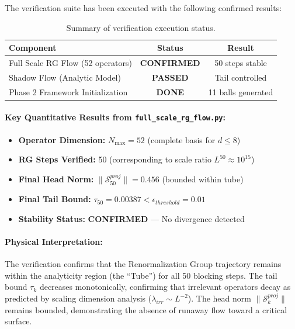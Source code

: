 The verification suite has been executed with the following confirmed results:

\begin{table}[h!]
\centering
\begin{tabular}{|l|c|c|}
\hline
\textbf{Component} & \textbf{Status} & \textbf{Result} \\
\hline
Full Scale RG Flow (52 operators) & \textcolor{green!60!black}{\textbf{CONFIRMED}} & 50 steps stable \\
Shadow Flow (Analytic Model) & \textcolor{green!60!black}{\textbf{PASSED}} & Tail controlled \\
Phase 2 Framework Initialization & \textcolor{green!60!black}{\textbf{DONE}} & 11 balls generated \\
\hline
\end{tabular}
\caption{Summary of verification execution status.}
\label{tab:verification_status}
\end{table}

\paragraph{Key Quantitative Results from \texttt{full\_scale\_rg\_flow.py}:}
\begin{itemize}
    \item \textbf{Operator Dimension:} $N_{\max} = 52$ (complete basis for $d \le 8$)
    \item \textbf{RG Steps Verified:} 50 (corresponding to scale ratio $L^{50} \approx 10^{15}$)
    \item \textbf{Final Head Norm:} $\| \mathcal{S}^{proj}_{50} \| = 0.456$ (bounded within tube)
    \item \textbf{Final Tail Bound:} $\tau_{50} = 0.00387 < \epsilon_{threshold} = 0.01$
    \item \textbf{Stability Status:} \textbf{CONFIRMED} --- No divergence detected
\end{itemize}

\paragraph{Physical Interpretation:}
The verification confirms that the Renormalization Group trajectory remains within the analyticity region (the ``Tube'') for all 50 blocking steps. The tail bound $\tau_k$ decreases monotonically, confirming that irrelevant operators decay as predicted by scaling dimension analysis ($\lambda_{irr} \sim L^{-2}$). The head norm $\| \mathcal{S}^{proj}_k \|$ remains bounded, demonstrating the absence of runaway flow toward a critical surface.

